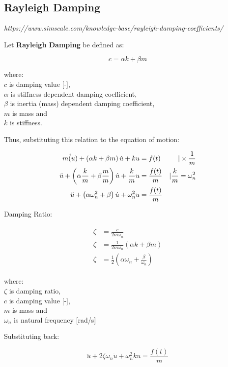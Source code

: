 \documentclass[10pt,b5paper,titlepage]{book}
\newenvironment{eqarray}
{
    \begin{eqnarray}
        \begin{aligned}
}
{
        \end{aligned}
    \end{eqnarray}
}
\begin{document}
\subsection{Rayleigh Damping}
\textit{https://www.simscale.com/knowledge-base/rayleigh-damping-coefficients/}

Let \textbf{Rayleigh Damping} be defined as:

\begin{equation}
    c = \alpha k + \beta m
\end{equation}

where:\\
$ c $ is damping value [-],\\
$ \alpha $ is stiffness dependent damping coefficient,\\
$ \beta $ is inertia (mass) dependent damping coefficient,\\
$ m $ is mass and\\
$ k $ is stiffness.

Thus, substituting this relation to the equation of motion:

\begin{eqarray}
    m \ddot(u) + \left(\alpha k + \beta m \right) \dot{u} + k u &= f(t) & \space \vert \times \frac{1}{m}\\
    \ddot{u} + \left(\alpha \frac{k}{m} + \beta \frac{m}{m} \right) \dot{u} + \frac{k}{m} u
    &= \frac{f(t)}{m} & \space \vert \frac{k}{m} = \omega_n^2 \\
    \ddot{u} + \left(\alpha \omega_n^2 + \beta \right) \dot{u} + \omega_n^2 u &= \frac{f(t)}{m} & \space
\end{eqarray}

Damping Ratio:

\begin{eqarray}
    \zeta &= \frac{c}{2 m \omega_n}\\
    \zeta &= \frac{1}{2 m \omega_n} \left( \alpha k + \beta m \right)\\
    \zeta &= \frac{1}{2} \left( \alpha \omega_n + \frac{\beta}{\omega_n} \right)
\end{eqarray}

where:\\
$ \zeta $ is damping ratio,\\
$ c $ is damping value [-],\\
$ m $ is mass and\\
$ \omega_n $ is natural frequency [rad/s]

Substituting back:

\begin{equation}
    \ddot{u} + 2 \zeta \omega_n \dot{u} + \omega_n^2 k u = \frac{f(t)}{m}
\end{equation}
\end{document}
